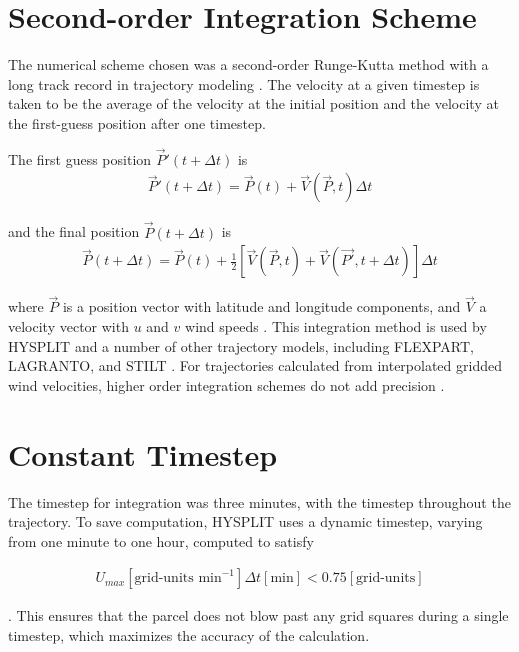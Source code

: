 \section{Second-order Integration Scheme}
The numerical scheme chosen was a second-order Runge-Kutta method with a long track record in trajectory modeling \cite{petterssen_weather_1940}.
The velocity at a given timestep is taken to be the average of the velocity at the initial position and the velocity at the first-guess position after one timestep.

The first guess position $\vec{P}' (t + \Delta t)$ is 
\begin{align}
\vec{P}' (t + \Delta t) = \vec{P}(t) + \vec{V} (\vec{P}, t) \Delta t
\end{align}

and the final position $\vec{P} (t + \Delta t)$ is
\begin{align}
\vec{P} (t + \Delta t) = \vec{P} (t) + \frac{1}{2} \left [ \vec{V} (\vec{P}, t) + \vec{V} (\vec{P'}, t + \Delta t) \right ] \Delta t
\end{align}

where $\vec{P}$ is a position vector with latitude and longitude components, and $\vec{V}$ a velocity vector with $u$ and $v$ wind speeds \cite{draxler_description_1997}.
This integration method is used by HYSPLIT and a number of other trajectory models, including FLEXPART, LAGRANTO, and STILT \cite{stein_noaas_2015} \cite{bowman_input_2013}. 
For trajectories calculated from interpolated gridded wind velocities, higher order integration schemes do not add precision \cite{draxler_description_1997}.  

\section{Constant Timestep}
The timestep for integration was three minutes, with the timestep throughout the trajectory. 
To save computation, HYSPLIT uses a dynamic timestep, varying from one minute to one hour, computed to satisfy

\begin{align}
U_{max} [\text{grid-units min}^{-1}] \Delta t [\text{min}] < 0.75 [\text{grid-units}] 
\end{align}

\cite{draxler_description_1997}. This ensures that the parcel does not blow past any grid squares during a single timestep, which maximizes the accuracy of the calculation. 

